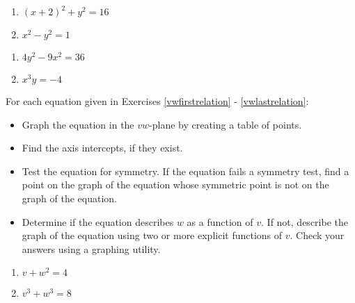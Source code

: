 \begin{multicols}{2}
\begin{enumerate}
\setcounter{enumi}{\value{HW}}

\item  $(x+2)^2+y^2 = 16$  \label{oldonethreefirst}

\item $x^{2} - y^{2} = 1$

\setcounter{HW}{\value{enumi}}
\end{enumerate}
\end{multicols}

\begin{multicols}{2}
\begin{enumerate}
\setcounter{enumi}{\value{HW}}

\item  $4y^2 - 9x^2 = 36$
\item $x^{3}y = -4$  \label{oldonethreelast}

\setcounter{HW}{\value{enumi}}
\end{enumerate}
\end{multicols}

For each equation given in Exercises \ref{vwfirstrelation} - \ref{vwlastrelation}:

\begin{itemize}

\item   Graph the equation in the $vw$-plane by creating a table of points. 

\item  Find the axis intercepts, if they exist.

\item  Test the equation for symmetry.  If the equation fails a symmetry test, find a point on the graph of the equation whose symmetric point is not on the graph of the equation.

\item  Determine if the equation describes $w$ as a function of $v$.  If not, describe the graph of the equation using two or more explicit functions of $v$.  Check your answers using a graphing utility.


\end{itemize}


\begin{multicols}{2}
\begin{enumerate}
\setcounter{enumi}{\value{HW}}

\item  $v+w^2 = 4$   \label{vwfirstrelation}
\item $v^{3}+w^3 =8$ 

\setcounter{HW}{\value{enumi}}
\end{enumerate}
\end{multicols}


